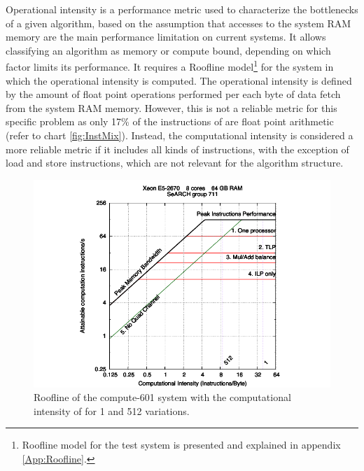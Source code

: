 Operational intensity \cite{Roofline} is a performance metric used to characterize the bottlenecks of a given algorithm, based on the assumption that accesses to the system RAM memory are the main performance limitation on current systems. It allows classifying an algorithm as memory or compute bound, depending on which factor limits its performance. It requires a Roofline model\footnote{Roofline model for the test system is presented and explained in appendix \ref{App:Roofline}.} for the system in which the operational intensity is computed. The operational intensity is defined by the amount of float point operations performed per each byte of data fetch from the system RAM memory. However, this is not a reliable metric for this specific problem as only 17\% of the instructions of \ttDilepKinFit are float point arithmetic (refer to chart \ref{fig:InstMix}). Instead, the computational intensity is considered a more reliable metric if it includes all kinds of instructions, with the exception of load and store instructions, which are not relevant for the algorithm structure.

\begin{figure}[!htp]
	\begin{center}
		\includegraphics[scale=1]{../../common/601_papi.pdf}  
		\caption{Roofline of the compute-601 system with the computational intensity of \ttDilepKinFit for 1 and 512 variations.}
		\label{fig:Roofline}
	\end{center}
\end{figure}

